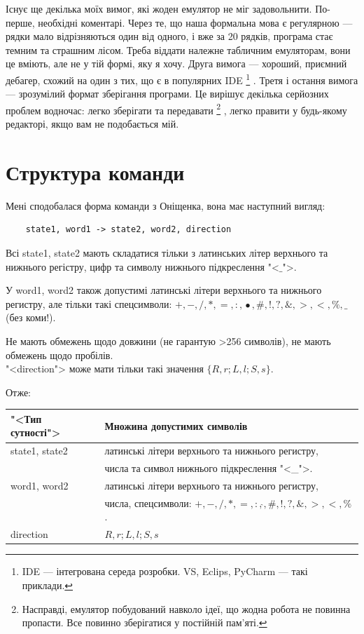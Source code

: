\documentclass[oneside,final,14pt]{extreport}
\begin{document}
Існує ще декілька моїх вимог, які жоден емулятор не міг задовольнити. По-перше, необхідні коментарі. Через те, що наша формальна мова є регулярною  --- рядки мало відрізняються один від одного, і вже за 20 рядків, програма стає темним та страшним лісом. Треба віддати належне табличним емуляторам, вони це вміють, але не у тій формі, яку я хочу.
Друга вимога --- хороший, приємний дебагер, схожий на один з тих, що є в популярних IDE
\footnote{IDE --- інтегрована середа розробки. VS, Eclips, PyCharm --- такі приклади.}
. Третя і остання вимога --- зрозумілий формат зберігання програми. Це вирішує декілька серйозних проблем водночас: легко зберігати та передавати
\footnote{Насправді, емулятор побудований навколо ідеї, що жодна робота не повинна пропасти. Все повинно зберігатися у постійній пам'яті.}
, легко правити у будь-якому редакторі, якщо вам не подобається мій.

\section{Структура команди}

Мені сподобалася форма команди з Оніщенка, вона має наступний вигляд:

\begin{verbatim}
	state1, word1 -> state2, word2, direction
\end{verbatim}

Всі state1, state2 мають складатися тільки з латинських літер верхнього та нижнього регістру, цифр та символу нижнього підкреслення "<$\_$">.
		
У word1, word2 також допустимі латинські літери верхнього та нижнього регистру, але тільки такі спецсимволи: $+,-,/,*,=,:,\hat{•},\#,!,?,\&,>,<,\%,\_$\\ (без коми!). 
		
Не мають обмежень щодо довжини (не гарантую >256 символів), не мають обмежень щодо пробілів.
\\
"<direction">  може мати тільки такі значення $\{R,r;L,l;S,s\}$.

Отже:
		
\vspace{0.2cm}
		
\begin{tabular}{ | l | l | }
	\hline
	"<Тип сутності"> & Множина допустимих символів \\ \hline
	state1, state2 & латинські літери верхнього та нижнього регистру,\\
	& числа та символ нижнього підкреслення "<\_">. \\
	\hline
	word1, word2 & латинські літери верхнього та нижнього регистру,\\ 
	& числа, спецсимволи: $+,-,/,*,=,:,\hat{},\#,!,?,\&,>,<,\%$.  \\
	\hline
	direction & $R,r;L,l;S,s$ \\
	\hline
\end{tabular}
\end{document}
